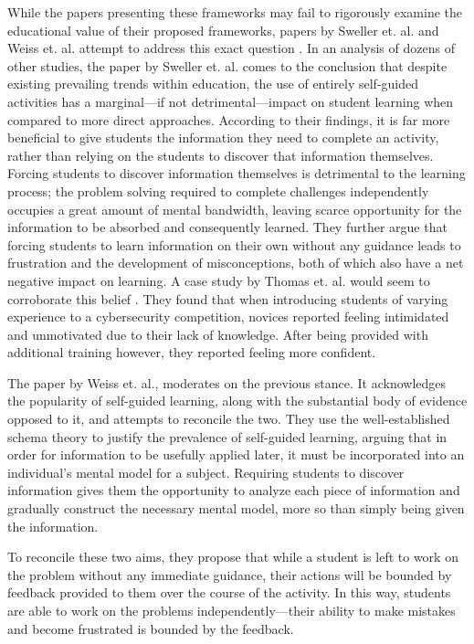 \documentclass{article}
\begin{document}
    While the papers presenting these frameworks may fail to rigorously examine the educational value of their proposed frameworks, papers by Sweller et. al. and Weiss et. al. attempt to address this exact question \cite{J-Sweller,R-Weiss}. 
    In an analysis of dozens of other studies, the paper by Sweller et. al. comes to the conclusion that despite existing prevailing trends within education, the use of entirely self-guided activities has a marginal---if not detrimental---impact on student learning when compared to more direct approaches. 
    According to their findings, it is far more beneficial to give students the information they need to complete an activity, rather than relying on the students to discover that information themselves. 
    Forcing students to discover information themselves is detrimental to the learning process; 
    the problem solving required to complete challenges independently occupies a great amount of mental bandwidth, leaving scarce opportunity for the information to be absorbed and consequently learned. 
    They further argue that forcing students to learn information on their own without any guidance leads to frustration and the development of misconceptions, both of which also have a net negative impact on learning. 
    A case study by Thomas et. al. would seem to corroborate this belief \cite{L-Thomas}. 
    They found that when introducing students of varying experience to a cybersecurity competition, novices reported feeling intimidated and unmotivated due to their lack of knowledge. 
    After being provided with additional training however, they reported feeling more confident. 

    The paper by Weiss et. al., moderates on the previous stance. 
    It acknowledges the popularity of self-guided learning, along with the substantial body of evidence opposed to it, and attempts to reconcile the two. 
    They use the well-established schema theory to justify the prevalence of self-guided learning, arguing that in order for information to be usefully applied later, it must be incorporated into an individual’s mental model for a subject. 
    Requiring students to discover information gives them the opportunity to analyze each piece of information and gradually construct the necessary mental model, more so than simply being given the information. 

    To reconcile these two aims, they propose that while a student is left to work on the problem without any immediate guidance, their actions will be bounded by feedback provided to them over the course of the activity. 
    In this way, students are able to work on the problems independently---their ability to make mistakes and become frustrated is bounded by the feedback. 
\end{document}
